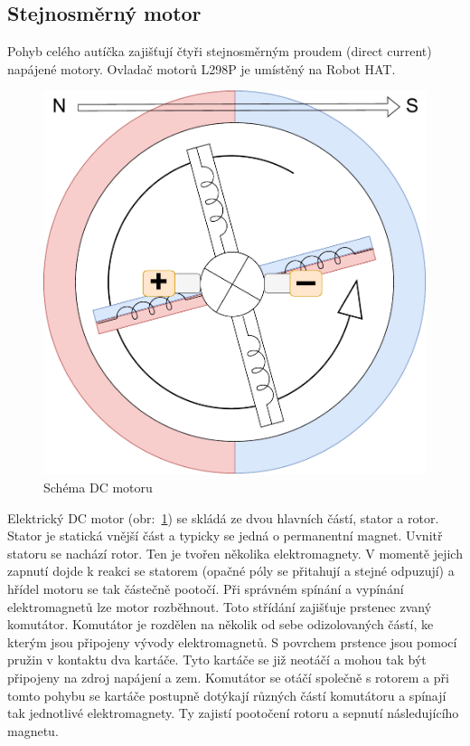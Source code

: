 \subsection*{Stejnosměrný motor}
Pohyb celého autíčka zajišťují čtyři stejnosměrným proudem (direct current) napájené motory. Ovladač motorů L298P je umístěný na Robot HAT.

\begin{figure}[h!]
	\centering
	\includegraphics[scale=0.5]{obrazky-figures/dc_motor.pdf}
	\caption{Schéma DC motoru}
	\label{fig:dc_motor}
\end{figure}

Elektrický DC motor (obr:~\ref{fig:dc_motor}) se skládá ze dvou hlavních částí, stator a rotor. Stator je statická vnější část a typicky se jedná o permanentní magnet. Uvnitř statoru se nachází rotor. Ten je tvořen několika elektromagnety. V momentě jejich zapnutí dojde k reakci se statorem (opačné póly se přitahují a stejné odpuzují) a hřídel motoru se tak částečně pootočí. Při správném spínání a vypínání elektromagnetů lze motor rozběhnout.
Toto střídání zajišťuje prstenec zvaný komutátor. Komutátor je rozdělen na několik od sebe odizolovaných částí, ke kterým jsou připojeny vývody elektromagnetů. S povrchem prstence jsou pomocí pružin v kontaktu dva kartáče. Tyto kartáče se již neotáčí a mohou tak být připojeny na zdroj napájení a zem. Komutátor se otáčí společně s rotorem a při tomto pohybu se kartáče postupně dotýkají různých částí komutátoru a spínají tak jednotlivé elektromagnety. Ty zajistí pootočení rotoru a sepnutí následujícího magnetu. \cite[std:~28-36]{mobilní_roboty}

